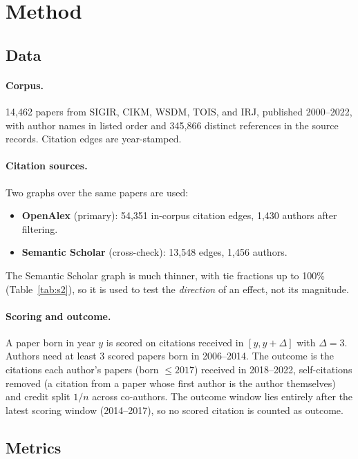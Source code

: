 \documentclass{article}
\begin{document}
\section{Method}

\subsection{Data}

\paragraph{Corpus.} 14,462 papers from SIGIR, CIKM, WSDM, TOIS, and IRJ, published 2000--2022,
with author names in listed order and 345,866 distinct references in the source records. Citation
edges are year-stamped.

\paragraph{Citation sources.} Two graphs over the same papers are used:
\begin{itemize}
  \item \textbf{OpenAlex} (primary): 54,351 in-corpus citation edges, 1,430 authors after filtering.
  \item \textbf{Semantic Scholar} (cross-check): 13,548 edges, 1,456 authors.
\end{itemize}
The Semantic Scholar graph is much thinner, with tie fractions up to 100\% (Table~\ref{tab:s2}), so
it is used to test the \emph{direction} of an effect, not its magnitude.

\paragraph{Scoring and outcome.} A paper born in year $y$ is scored on citations received in
$[y, y+\Delta]$ with $\Delta = 3$. Authors need at least 3 scored papers born in 2006--2014. The
outcome is the citations each author's papers (born $\leq 2017$) received in 2018--2022,
self-citations removed (a citation from a paper whose first author is the author themselves) and
credit split $1/n$ across co-authors. The outcome window lies entirely after the latest scoring
window (2014--2017), so no scored citation is counted as outcome.

\subsection{Metrics}
\end{document}
